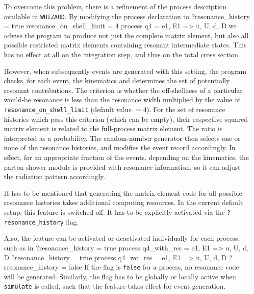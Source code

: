 \documentclass[12pt]{book}
\newenvironment{Code}%
  {\begingroup\footnotesize
   \quote
   \Verbatim[frame=single]}%
  {\endVerbatim
   \endquote
   \endgroup\noindent}
\newcommand{\ttt}[1]{\texttt{#1}}
\newcommand{\whizard}{\ttt{WHIZARD}}
\begin{document}
To overcome this problem, there is a refinement of the process description
available in \whizard.  By modifying the process declaration to
\begin{Code}
  ?resonance_history = true
  resonance_on_shell_limit = 4
  process q4 = e1, E1 => u, U, d, D
\end{Code}
we advise the program to produce not just the complete matrix element, but
also all possible restricted matrix elements containing resonant intermediate
states.  This has no effect at all on the integration step, and thus on the
total cross section.

However, when subsequently events are generated with this setting, the program
checks, for each event, the kinematics and determines the set of potentially
resonant contributions.  The criterion is whether the off-shellness of a
particular would-be resonance is less than the resonance width multiplied by
the value of \verb|resonance_on_shell_limit| (default value $=4$).  For the
set of resonance histories which pass this criterion (which can be empty),
their respective squared matrix element is related to the full-process matrix
element.  The ratio is interpreted as a probability.  The random-number
generator then selects one or none of the resonance histories, and modifies
the event record accordingly.  In effect, for an appropriate fraction of the
events, depending on the kinematics, the parton-shower module is provided with
resonance information, so it can adjust the radiation pattern accordingly.

It has to be mentioned that generating the matrix-element code for all
possible resonance histories takes additional computing resources.  In the
current default setup, this feature is switched off.  It has to be explicitly
activated via the \verb|?resonance_history| flag.

Also, the feature can be activated or deactivated individually for
each process, such as in
\begin{Code}
  ?resonance_history = true
  process q4_with_res = e1, E1 => u, U, d, D  { ?resonance_history = true }
  process q4_wo_res   = e1, E1 => u, U, d, D  { ?resonance_history = false }
\end{Code}
If the flag is \verb|false| for a process, no resonance code will be
generated.  Similarly, the flag has to be globally or locally active
when \verb|simulate| is called, such that the feature takes effect for
event generation.
\end{document}
